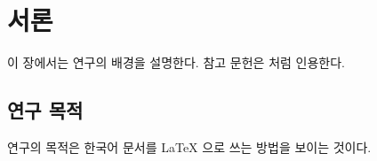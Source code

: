 \chapter{서론}\label{ch:intro}
이 장에서는 연구의 배경을 설명한다. 참고 문헌은 \cite{knuth1984} 처럼 인용한다.

\section{연구 목적}
연구의 목적은 한국어 문서를 LaTeX 으로 쓰는 방법을 보이는 것이다.
